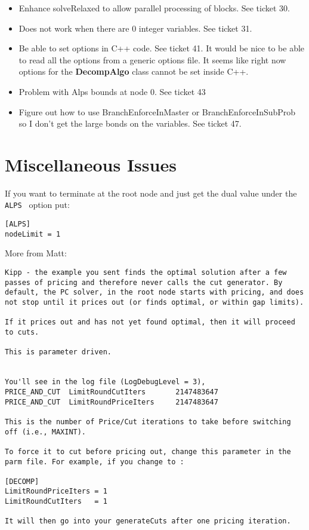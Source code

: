 \documentclass[11pt]{article}
\newcounter{Fig}
\begin{document}
\begin{itemize}
  \item Enhance solveRelaxed to allow parallel processing of blocks. See ticket
  30.
  \item Does not work when there are 0 integer variables. See ticket 31.
  
  \item Be able to set options in C++ code. See ticket 41.  It would be nice to
  be able to read all the options from a generic options file. It seems like
  right now options for the {\bf DecompAlgo } class cannot be set inside C++.
  
  \item Problem with Alps  bounds at node 0. See ticket 43
  
  \item Figure out how to use BranchEnforceInMaster or BranchEnforceInSubProb so
  I don't get the large bonds on the variables. See ticket 47.
\end{itemize}



\section{Miscellaneous Issues}
 
 If you want to terminate at the root node and just get the dual value under the {\tt ALPS } option put:
 
\begin{verbatim}
[ALPS]
nodeLimit = 1
\end{verbatim}

More from Matt:



\begin{verbatim}
Kipp - the example you sent finds the optimal solution after a few passes of pricing and therefore never calls the cut generator. By default, the PC solver, in the root node starts with pricing, and does not stop until it prices out (or finds optimal, or within gap limits).

If it prices out and has not yet found optimal, then it will proceed to cuts.

This is parameter driven.


You'll see in the log file (LogDebugLevel = 3),
PRICE_AND_CUT  LimitRoundCutIters       2147483647
PRICE_AND_CUT  LimitRoundPriceIters     2147483647

This is the number of Price/Cut iterations to take before switching off (i.e., MAXINT).

To force it to cut before pricing out, change this parameter in the parm file. For example, if you change to :

[DECOMP]
LimitRoundPriceIters = 1
LimitRoundCutIters   = 1

It will then go into your generateCuts after one pricing iteration.
\end{verbatim}
\end{document}
